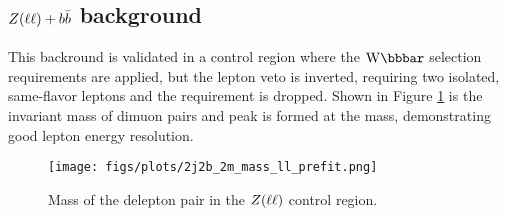
\subsection{$Z(\ell\ell) + b\bar{b}$ background}

This backround is validated in a control region where the $\Wbb$
selection requirements are applied, but the lepton veto 
is inverted, requiring two isolated, same-flavor leptons 
and the \MT requirement is dropped.
Shown in Figure \ref{fig:z_peak} is the invariant mass of dimuon pairs
and peak is formed at the \MyZ mass,
demonstrating good lepton energy resolution.

\begin{figure}
      \center
      \texttt{[image: figs/plots/2j2b\_2m\_mass\_ll\_prefit.png]}
      \caption{Mass of the delepton pair in the $Z(\ell\ell)$ control region.
      }
      \label{fig:z_peak}
\end{figure}




%
%

